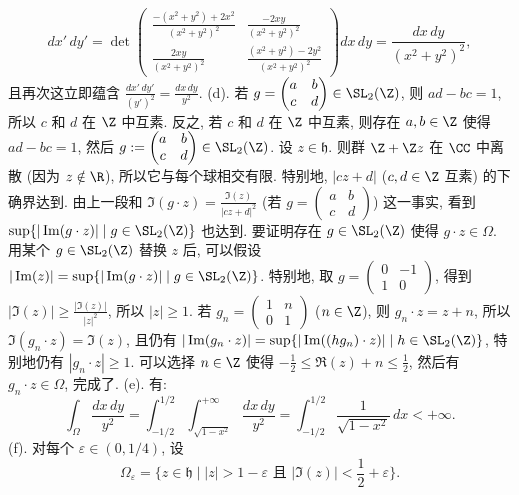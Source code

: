 \begin{solution}
\[
dx'\,dy' = \det\begin{pmatrix} \frac{-(x^2+y^2)+2x^2}{(x^2+y^2)^2} & \frac{-2xy}{(x^2+y^2)^2} \\ \frac{2xy}{(x^2+y^2)^2} & \frac{(x^2+y^2)-2y^2}{(x^2+y^2)^2} \end{pmatrix}dx\,dy = \frac{dx\,dy}{(x^2 + y^2)^2},
\]
且再次这立即蕴含 $\frac{dx'\,dy'}{(y')^2} = \frac{dx\,dy}{y^2}$.
(d). 若 $g = \begin{pmatrix} a & b \\ c & d \end{pmatrix} \in \SL_2(\Z)$, 则 $ad - bc = 1$, 所以 $c$ 和 $d$ 在 $\Z$ 中互素. 反之, 若 $c$ 和 $d$ 在 $\Z$ 中互素, 则存在 $a, b \in \Z$ 使得 $ad - bc = 1$, 然后 $g := \begin{pmatrix} a & b \\ c & d \end{pmatrix} \in \SL_2(\Z)$.
设 $z \in \mathfrak{h}$. 则群 $\Z + \Z z$ 在 $\CC$ 中离散 (因为 $z \notin \R$), 所以它与每个球相交有限. 特别地, $|cz + d|$ ($c, d \in \Z$ 互素) 的下确界达到. 由上一段和 $\Im(g \cdot z) = \frac{\Im(z)}{|cz+d|^2}$ (若 $g = \begin{pmatrix} a & b \\ c & d \end{pmatrix}$) 这一事实, 看到 $\sup\{|\Im(g \cdot z)| \mid g \in \SL_2(\Z)\}$ 也达到. 要证明存在 $g \in \SL_2(\Z)$ 使得 $g \cdot z \in \Omega$. 用某个 $g \in \SL_2(\Z)$ 替换 $z$ 后, 可以假设 $|\Im(z)| = \sup\{|\Im(g \cdot z)| \mid g \in \SL_2(\Z)\}$. 特别地, 取 $g = \begin{pmatrix} 0 & -1 \\ 1 & 0 \end{pmatrix}$, 得到 $|\Im(z)| \geq \frac{|\Im(z)|}{|z|^2}$, 所以 $|z| \geq 1$. 若 $g_n = \begin{pmatrix} 1 & n \\ 0 & 1 \end{pmatrix}$ ($n \in \Z$), 则 $g_n \cdot z = z + n$, 所以 $\Im(g_n \cdot z) = \Im(z)$, 且仍有 $|\Im(g_n \cdot z)| = \sup\{|\Im((hg_n) \cdot z)| \mid h \in \SL_2(\Z)\}$, 特别地仍有 $|g_n \cdot z| \geq 1$. 可以选择 $n \in \Z$ 使得 $-\frac{1}{2} \leq \Re(z) + n \leq \frac{1}{2}$, 然后有 $g_n \cdot z \in \Omega$, 完成了.
(e). 有:
\[
\int_{\Omega}\frac{dx\,dy}{y^2} = \int_{-1/2}^{1/2}\int_{\sqrt{1-x^2}}^{+\infty}\frac{dx\,dy}{y^2} = \int_{-1/2}^{1/2}\frac{1}{\sqrt{1-x^2}}\,dx < +\infty.
\]
(f). 对每个 $\varepsilon \in (0, 1/4)$, 设
\[
\Omega_{\varepsilon} = \{z \in \mathfrak{h} \mid |z| > 1 - \varepsilon \text{ 且 } |\Im(z)| < \frac{1}{2} + \varepsilon\}.
\]
\end{solution}
